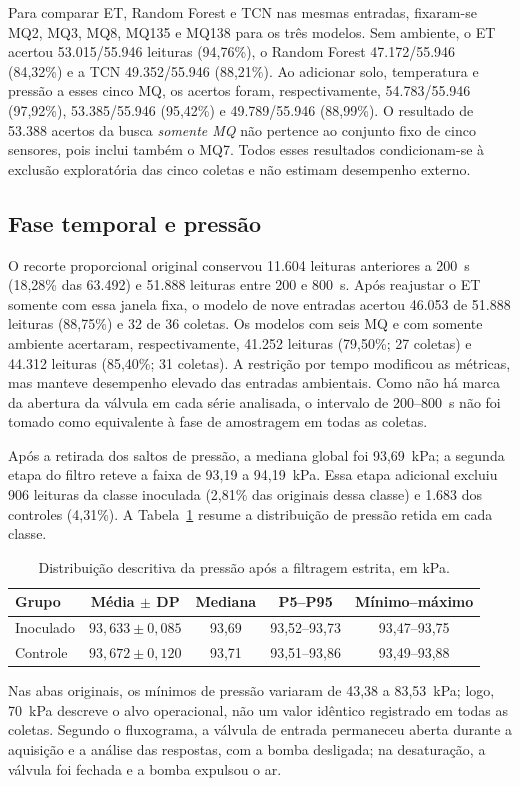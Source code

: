 Para comparar ET, Random Forest e TCN nas mesmas entradas, fixaram-se
MQ2, MQ3, MQ8, MQ135 e MQ138 para os três modelos. Sem ambiente, o ET
acertou 53.015/55.946 leituras (94,76\%), o Random Forest
47.172/55.946 (84,32\%) e a TCN 49.352/55.946 (88,21\%). Ao adicionar
solo, temperatura e pressão a esses cinco MQ, os acertos foram,
respectivamente, 54.783/55.946 (97,92\%), 53.385/55.946 (95,42\%) e
49.789/55.946 (88,99\%). O resultado de 53.388 acertos da busca
\emph{somente MQ} não pertence ao conjunto fixo de cinco sensores, pois
inclui também o MQ7. Todos esses resultados condicionam-se à exclusão
exploratória das cinco coletas e não estimam desempenho externo.

\subsection{Fase temporal e pressão}
\label{subsec:resultados_fase_pressao}

O recorte proporcional original conservou 11.604 leituras anteriores a
200~s (18,28\% das 63.492) e 51.888 leituras entre 200 e 800~s. Após
reajustar o ET somente com essa janela fixa, o modelo de nove entradas
acertou 46.053 de 51.888 leituras (88,75\%) e 32 de 36 coletas. Os
modelos com seis MQ e com somente ambiente acertaram, respectivamente,
41.252 leituras (79,50\%; 27 coletas) e 44.312 leituras (85,40\%;
31 coletas). A restrição por tempo modificou as métricas, mas manteve
desempenho elevado das entradas ambientais. Como não há marca da abertura
da válvula em cada série analisada, o intervalo de 200--800~s não foi
tomado como equivalente à fase de amostragem em todas as coletas.

Após a retirada dos saltos de pressão, a mediana global foi 93,69~kPa;
a segunda etapa do filtro reteve a faixa de 93,19 a 94,19~kPa. Essa
etapa adicional excluiu 906 leituras da classe inoculada (2,81\% das
originais dessa classe) e 1.683 dos controles (4,31\%). A
Tabela~\ref{tab:pressao_classe_final} resume a distribuição de pressão
retida em cada classe.
\begin{table}[H]
    \centering
    \caption{Distribuição descritiva da pressão após a filtragem estrita, em kPa.}
    \label{tab:pressao_classe_final}
    \begin{tabular}{lcccc}
        \hline
        Grupo & Média $\pm$ DP & Mediana & P5--P95 & Mínimo--máximo \\
        \hline
        Inoculado & $93{,}633\pm0{,}085$ & 93,69 & 93,52--93,73 & 93,47--93,75 \\
        Controle & $93{,}672\pm0{,}120$ & 93,71 & 93,51--93,86 & 93,49--93,88 \\
        \hline
    \end{tabular}
\end{table}
Nas abas
originais, os mínimos de pressão variaram de 43,38 a 83,53~kPa; logo,
70~kPa descreve o alvo operacional, não um valor idêntico registrado em
todas as coletas. Segundo o fluxograma, a válvula de entrada permaneceu
aberta durante a aquisição e a análise das respostas, com a bomba
desligada; na desaturação, a válvula foi fechada e a bomba expulsou o ar.
